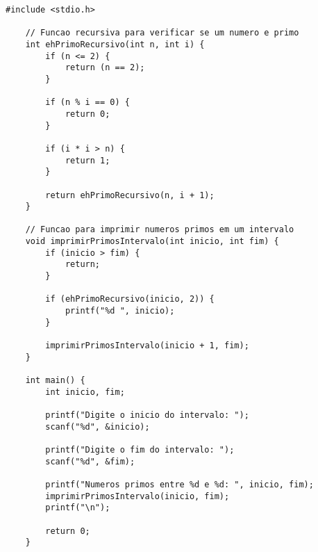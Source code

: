 \begin{lstlisting}[style=codigoC]
    #include <stdio.h>

    // Funcao recursiva para verificar se um numero e primo
    int ehPrimoRecursivo(int n, int i) {
        if (n <= 2) {
            return (n == 2);
        }
        
        if (n % i == 0) {
            return 0;
        }
        
        if (i * i > n) {
            return 1;
        }
        
        return ehPrimoRecursivo(n, i + 1);
    }
    
    // Funcao para imprimir numeros primos em um intervalo
    void imprimirPrimosIntervalo(int inicio, int fim) {
        if (inicio > fim) {
            return;
        }
        
        if (ehPrimoRecursivo(inicio, 2)) {
            printf("%d ", inicio);
        }
        
        imprimirPrimosIntervalo(inicio + 1, fim);
    }
    
    int main() {
        int inicio, fim;
    
        printf("Digite o inicio do intervalo: ");
        scanf("%d", &inicio);
    
        printf("Digite o fim do intervalo: ");
        scanf("%d", &fim);
    
        printf("Numeros primos entre %d e %d: ", inicio, fim);
        imprimirPrimosIntervalo(inicio, fim);
        printf("\n");
    
        return 0;
    }
        
\end{lstlisting}